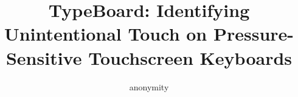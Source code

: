 \documentclass[acmlarge]{acmart}
\begin{document}
\begin{CJK*}{UTF8}{gbsn}
		

\title{TypeBoard: Identifying Unintentional Touch on Pressure-Sensitive Touchscreen Keyboards}

\author{anonymity}


\renewcommand{\shortauthors}{Trovato and Tobin, et al.}

\begin{abstract}



\end{abstract}
\end{CJK*}
\end{document}
